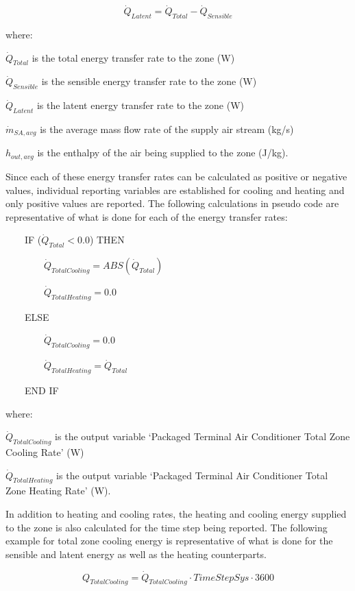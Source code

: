 \begin{equation}
  \dot{Q}_{Latent} = \dot{Q}_{Total} - \dot{Q}_{Sensible}
\end{equation}

where:

\(\dot{Q}_{Total}\) is the total energy transfer rate to the zone (W)

\(\dot{Q}_{Sensible}\) is the sensible energy transfer rate to the zone (W)

\(\dot{Q}_{Latent}\) is the latent energy transfer rate to the zone (W)

\(\dot{m}_{SA,avg}\) is the average mass flow rate of the supply air stream (kg/s)

\(h_{out,avg}\) is the enthalpy of the air being supplied to the zone (J/kg).

Since each of these energy transfer rates can be calculated as positive or negative values, individual reporting variables are established for cooling and heating and only positive values are reported. The following calculations in pseudo code are representative of what is done for each of the energy transfer rates:

~~~~IF (\(\dot{Q}_{Total} < 0.0\)) THEN

~~~~~~~~\(\dot{Q}_{TotalCooling} = ABS(\dot{Q}_{Total})\)

~~~~~~~~\(\dot{Q}_{TotalHeating} = 0.0\)

~~~~ELSE

~~~~~~~~\(\dot{Q}_{TotalCooling} = 0.0\)

~~~~~~~~\(\dot{Q}_{TotalHeating} = \dot{Q}_{Total}\)

~~~~END IF

where:

\(\dot{Q}_{TotalCooling}\) is the output variable `Packaged Terminal Air Conditioner Total Zone Cooling Rate' (W)

\(\dot{Q}_{TotalHeating}\) is the output variable `Packaged Terminal Air Conditioner Total Zone Heating Rate' (W).

In addition to heating and cooling rates, the heating and cooling energy supplied to the zone is also calculated for the time step being reported. The following example for total zone cooling energy is representative of what is done for the sensible and latent energy as well as the heating counterparts.

\begin{equation}
  Q_{TotalCooling} = \dot{Q}_{TotalCooling} \cdot TimeStepSys \cdot 3600
\end{equation}

